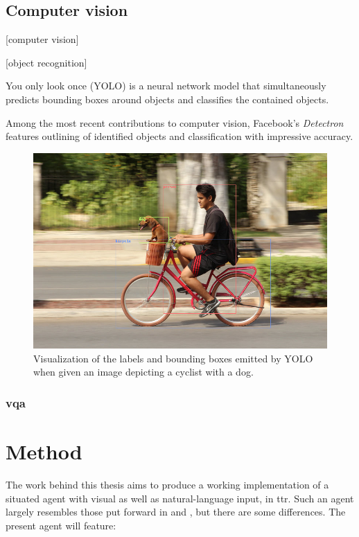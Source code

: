 \documentclass[11pt, a4paper]{article}
\begin{document}
\subsection{Computer vision}

[computer vision]

[object recognition]

You only look once (YOLO) \citep{RedmonYouOnlyLook2015} is a neural network model that simultaneously predicts bounding boxes around objects and classifies the contained objects.

Among the most recent contributions to computer vision, Facebook's \textit{Detectron} \citep{Detectron2018} features outlining of identified objects and classification with impressive accuracy.

\begin{figure}[h]
\label{fig:dogbike_annotated}
\includegraphics[width=\textwidth]{dogbike_annotated}
\centering
\caption{Visualization of the labels and bounding boxes emitted by YOLO when given an image depicting a cyclist with a dog.}
\end{figure}

\subsubsection{\Acrfull{vqa}}



\section{Method}
\label{sec:method}

The work behind this thesis aims to produce a working implementation of a situated agent with visual as well as natural-language input, in \gls{ttr}.
Such an agent largely resembles those put forward in \cite{lspc} and \cite{ttrspat}, but there are some differences.
The present agent will feature:
\end{document}

